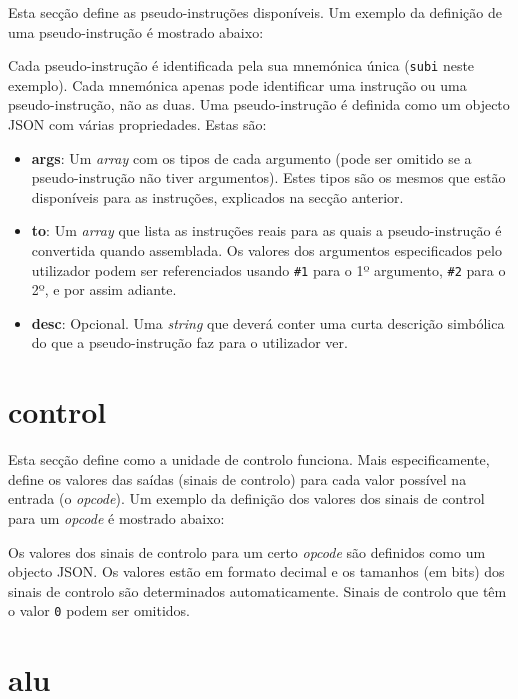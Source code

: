 \documentclass[11pt,a4paper,twoside,titlepage]{report}
\begin{document}
Esta secção define as pseudo-instruções disponíveis.
Um exemplo da definição de uma pseudo-instrução é mostrado abaixo:



Cada pseudo-instrução é identificada pela sua mnemónica única (\verb+subi+
neste exemplo). Cada mnemónica apenas pode identificar uma instrução ou uma
pseudo-instrução, não as duas.
Uma pseudo-instrução é definida como um objecto JSON com várias propriedades.
Estas são:

\begin{itemize}
	\item \textbf{args}: Um \emph{array} com os tipos de cada argumento (pode ser
		omitido se a pseudo-instrução não tiver argumentos). Estes tipos são os
		mesmos que estão disponíveis para as instruções, explicados na secção
		anterior.
	\item \textbf{to}: Um \emph{array} que lista as instruções reais para as quais
		a pseudo-instrução é convertida quando assemblada. Os valores dos argumentos
		especificados pelo utilizador podem ser referenciados usando \verb+#1+ para
		o 1º argumento, \verb+#2+ para o 2º, e por assim adiante.
	\item \textbf{desc}: Opcional. Uma \emph{string} que deverá conter uma
		curta descrição simbólica do que a pseudo-instrução faz para o utilizador 
		ver.
\end{itemize}


\section{control}

Esta secção define como a unidade de controlo funciona. Mais especificamente,
define os valores das saídas (sinais de controlo) para cada valor possível na
entrada (o \emph{opcode}).
Um exemplo da definição dos valores dos sinais de control para um \emph{opcode}
é mostrado abaixo:



Os valores dos sinais de controlo para um certo \emph{opcode} são definidos como
um objecto JSON. Os valores estão em formato decimal e os tamanhos (em bits) dos
sinais de controlo são determinados automaticamente.
Sinais de controlo que têm o valor \verb+0+ podem ser omitidos.


\section{alu}
\end{document}
